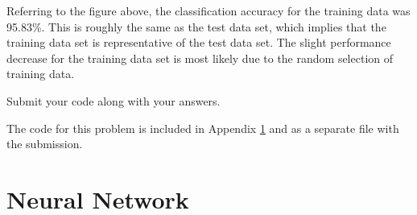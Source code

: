 \documentclass[fleqn]{article}
\begin{document}
\begin{enumerate}
\begin{enumerate}
			Referring to the figure above, the classification accuracy for the training data was 95.83\%. This is roughly the same as the test data set, which implies that the training data set is representative of the test data set. The slight performance decrease for the training data set is most likely due to the random selection of training data.
			
		\end{enumerate}
		
		Submit your code along with your answers.
		
		The code for this problem is included in Appendix \ref{neural_network} and as a separate file with the submission.
		
	\end{enumerate}
	
	\pagebreak
	\appendix
	\section{Neural Network}
	\label{neural_network}
	\lstset{style=Matlab-editor,basicstyle=\ttfamily\footnotesize}
	
	\raggedbottom
	\pagebreak
\end{document}
